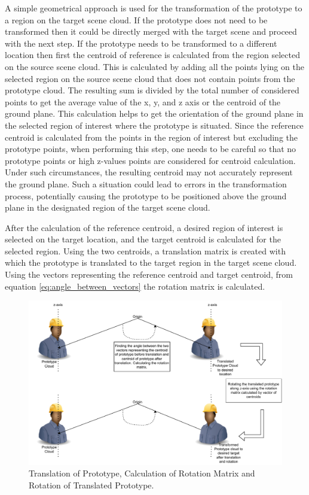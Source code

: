 A simple geometrical approach is used for the transformation of the prototype to a region on the target scene cloud. If the prototype does not need to be transformed then it could be directly merged with the target scene and proceed with the next step. If the prototype needs to be transformed to a different location then first the centroid of reference is calculated from the region selected on the source scene cloud. This is calculated by adding all the points lying on the selected region on the source scene cloud that does not contain points from the prototype cloud. The resulting sum is divided by the total number of considered points to get the average value of the x, y, and z axis or the centroid of the ground plane. This calculation helps to get the orientation of the ground plane in the selected region of interest where the prototype is situated. Since the reference centroid is calculated from the points in the region of interest but excluding the prototype points, when performing this step, one needs to be careful so that no prototype points or high z-values points are considered for centroid calculation. Under such circumstances, the resulting centroid may not accurately represent the ground plane. Such a situation could lead to errors in the transformation process, potentially causing the prototype to be positioned above the ground plane in the designated region of the target scene cloud.

After the calculation of the reference centroid, a desired region of interest is selected on the target location, and the target centroid is calculated for the selected region. Using the two centroids, a translation matrix is created with which the prototype is translated to the target region in the target scene cloud. Using the vectors representing the reference centroid and target centroid, from equation \ref{eq:angle_between_vectors} the rotation matrix is calculated.

\begin{figure}[htb]
    \centering
    \includegraphics[width=0.8\linewidth]{97_graphics/concepts/rotational_matrix_calculation.pdf}
    \caption{Translation of Prototype, Calculation of Rotation Matrix and Rotation of Translated Prototype.}
    \label{fig:rotation_matrix_calculation}
\end{figure}


